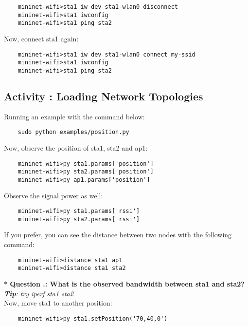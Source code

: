 \begin{verbatim}
    mininet-wifi>sta1 iw dev sta1-wlan0 disconnect
    mininet-wifi>sta1 iwconfig
    mininet-wifi>sta1 ping sta2
\end{verbatim}


\noindent Now, connect sta1 again: 

\begin{verbatim}
    mininet-wifi>sta1 iw dev sta1-wlan0 connect my-ssid
    mininet-wifi>sta1 iwconfig
    mininet-wifi>sta1 ping sta2
\end{verbatim}


\subsection{Activity \themycounter{}: Loading Network Topologies}

\noindent Running an example with the command below:
\begin{verbatim}
    sudo python examples/position.py
\end{verbatim}


\noindent Now, observe the position of sta1, sta2 and ap1:
\begin{verbatim}
    mininet-wifi>py sta1.params['position']
    mininet-wifi>py sta2.params['position']
    mininet-wifi>py ap1.params['position']
\end{verbatim}



\noindent Observe the signal power as well:
\begin{verbatim}
    mininet-wifi>py sta1.params['rssi']
    mininet-wifi>py sta2.params['rssi']
\end{verbatim}


\noindent If you prefer, you can see the distance between two nodes with the following command:

\begin{verbatim}
    mininet-wifi>distance sta1 ap1
    mininet-wifi>distance sta1 sta2   
\end{verbatim}


\noindent \textbf{$\ast$ Question \themycounter.\thequestion{}: What is the observed bandwidth between sta1 and sta2?}
\\\textit{\textbf{Tip}: try iperf sta1 sta2}
\\

\noindent Now, move sta1 to another position:
\begin{verbatim}
    mininet-wifi>py sta1.setPosition('70,40,0')
\end{verbatim}


